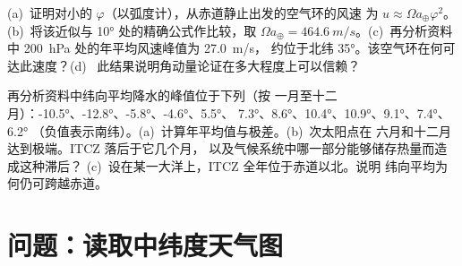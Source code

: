 \begin{exercise}[$\star\star\star$]\label{exo:b1:atmospheric-circulation:11}
(a)~证明对小的 $\varphi$（以弧度计），从赤道静止出发的空气环的风速
为 $u \approx \Omega a_\oplus\varphi^2$。(b)~将该近似与
\ang{10} 处的精确公式作比较，取 $\Omega a_\oplus = \qty{464.6}{m/s}$。(c)~再分析资料中
\qty{200}{hPa} 处的年平均风速峰值为 \qty{27.0}{m/s}，
约位于北纬 \ang{35}。该空气环在何可达此速度？(d)~
此结果说明角动量论证在多大程度上可以信赖？
\end{exercise}

\begin{exercise}[$\star\star\star$]\label{exo:b1:atmospheric-circulation:12}
再分析资料中纬向平均降水的峰值位于下列（按
一月至十二月）：\ang{-10.5}、\ang{-12.8}、\ang{-5.8}、\ang{-4.6}、\ang{5.5}、
\ang{7.3}、\ang{8.6}、\ang{10.4}、\ang{10.9}、\ang{9.1}、\ang{7.4}、\ang{6.2}
（负值表示南纬）。(a)~计算年平均值与极差。(b)~次太阳点在
六月和十二月达到极端。ITCZ 落后于它几个月，
以及气候系统中哪一部分能够储存热量而造成这种滞后？
(c)~设在某一大洋上，ITCZ 全年位于赤道以北。说明
纬向平均为何仍可跨越赤道。
\end{exercise}

\section{问题：读取中纬度天气图}

